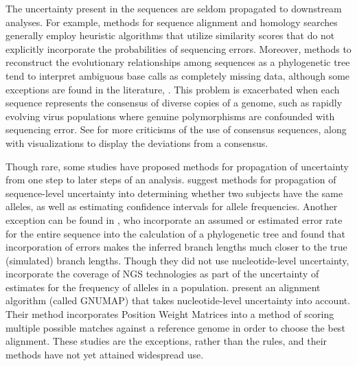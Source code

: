 \documentclass[10pt]{article}
\begin{document}
The uncertainty present in the sequences are seldom propagated to downstream analyses.
For example, methods for sequence alignment and homology searches generally employ heuristic algorithms that utilize similarity scores that do not explicitly incorporate the probabilities of sequencing errors.
Moreover, methods to reconstruct the evolutionary relationships among sequences as a phylogenetic tree tend to interpret ambiguous base calls as completely missing data, although some exceptions are found in the literature, \eg \citet{depristoFrameworkVariationDiscovery2011}.
This problem is exacerbated when each sequence represents the consensus of diverse copies of a genome, such as rapidly evolving virus populations where genuine polymorphisms are confounded with sequencing error. 
See \citet{schneiderConsensusSequenceZen2002} for more criticisms of the use of consensus sequences, along with visualizations \citep[][called \emph{sequence logos}]{schneiderSequenceLogosNew1990} to display the deviations from a consensus.

Though rare, some studies have proposed methods for propagation of uncertainty from one step to later steps of an analysis.
\citet{oraweAccountingUncertaintyDNA2015} suggest methods for propagation of sequence-level uncertainty into determining whether two subjects have the same alleles, as well as estimating confidence intervals for allele frequencies. 
Another exception can be found in \citet{kuhnerCorrectingSequencingError2014}, who incorporate an assumed or estimated error rate for the entire sequence into the calculation of a phylogenetic tree and found that incorporation of errors makes the inferred branch lengths much closer to the true (simulated) branch lengths.
Though they did not use nucleotide-level uncertainty, \citet{gompertHierarchicalBayesianModel2011} incorporate the coverage of NGS technologies as part of the uncertainty of estimates for the frequency of alleles in a population.
\citet{clementGNUMAPAlgorithmUnbiased2010} present an alignment algorithm (called GNUMAP) that takes nucleotide-level uncertainty into account. 
Their method incorporates Position Weight Matrices into a method of scoring multiple possible matches against a reference genome in order to choose the best alignment. 
These studies are the exceptions, rather than the rules, and their methods have not yet attained widespread use.
\end{document}
